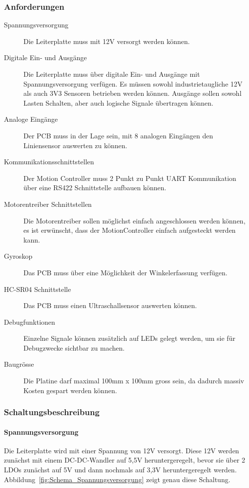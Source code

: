 \documentclass[main.  tex]{subfiles} %
\begin{document}
\subsubsection*{Anforderungen}

\begin{description}
    \item[Spannungsversorgung] Die Leiterplatte muss mit 12V versorgt werden können.
    \item[Digitale Ein- und Ausgänge] Die Leiterplatte muss über digitale Ein- und
          Ausgänge mit Spannungsversorgung verfügen. Es müssen sowohl industrietaugliche
          12V als auch 3V3 Sensoren betrieben werden können. Ausgänge sollen sowohl
          Lasten Schalten, aber auch logische Signale übertragen können.
    \item[Analoge Eingänge] Der PCB muss in der Lage sein, mit 8 analogen Eingängen den
          Liniensensor auswerten zu können.
    \item[Kommunikationsschnittstellen] Der Motion Controller muss 2 Punkt zu Punkt UART
          Kommunikation über eine RS422 Schnittstelle aufbauen können.
    \item[Motorentreiber Schnittstellen] Die Motorentreiber sollen möglichst einfach
          angeschlossen werden können, es ist erwünscht, dass der MotionController
          einfach aufgesteckt werden kann.
    \item[Gyroskop] Das PCB muss über eine Möglichkeit der Winkelerfassung verfügen.
    \item[HC-SR04 Schnittstelle] Das PCB muss einen Ultraschallsensor auswerten können.
    \item[Debugfunktionen] Einzelne Signale können zusätzlich auf LEDs gelegt werden, um
          sie für Debugzwecke sichtbar zu machen.
    \item[Baugrösse] Die Platine darf maximal 100mm x 100mm gross sein, da dadurch massiv
          Kosten gespart werden können.
\end{description}

\subsubsection*{Schaltungsbeschreibung}

\paragraph{Spannungsversorgung}

Die Leiterplatte wird mit einer Spannung von 12V versorgt. Diese 12V werden
zunächst mit einem DC-DC-Wandler auf 5,5V heruntergeregelt, bevor sie über 2
LDOs zunächst auf 5V und dann nochmals auf 3,3V heruntergeregelt werden.
Abbildung~\ref{fig:Schema_Spannungsversorgung} zeigt genau diese Schaltung.
\end{document}

